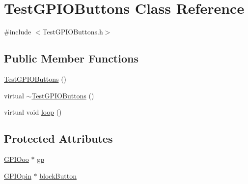 \hypertarget{class_test_g_p_i_o_buttons}{\section{Test\-G\-P\-I\-O\-Buttons Class Reference}
\label{class_test_g_p_i_o_buttons}
}


{\ttfamily \#include $<$Test\-G\-P\-I\-O\-Buttons.\-h$>$}

\subsection*{Public Member Functions}
\begin{DoxyCompactItemize}
\item 
\hyperlink{class_test_g_p_i_o_buttons_a0a73a9e5abef2757fbeb1b98993a5ff7}{Test\-G\-P\-I\-O\-Buttons} ()
\item 
virtual \hyperlink{class_test_g_p_i_o_buttons_ae50451f7b20b3e446bb18bceaa627bab}{$\sim$\-Test\-G\-P\-I\-O\-Buttons} ()
\item 
virtual void \hyperlink{class_test_g_p_i_o_buttons_aa876366d88e7994abf3efda15ac558e1}{loop} ()
\end{DoxyCompactItemize}
\subsection*{Protected Attributes}
\begin{DoxyCompactItemize}
\item 
\hyperlink{class_g_p_i_ooo}{G\-P\-I\-Ooo} $\ast$ \hyperlink{class_test_g_p_i_o_buttons_a6510eba2c7aa5b2e6451a91230328075}{gp}
\item 
\hyperlink{class_g_p_i_opin}{G\-P\-I\-Opin} $\ast$ \hyperlink{class_test_g_p_i_o_buttons_a209a3f0cba53b014bedcd4b7033f550c}{block\-Button}
\end{DoxyCompactItemize}


